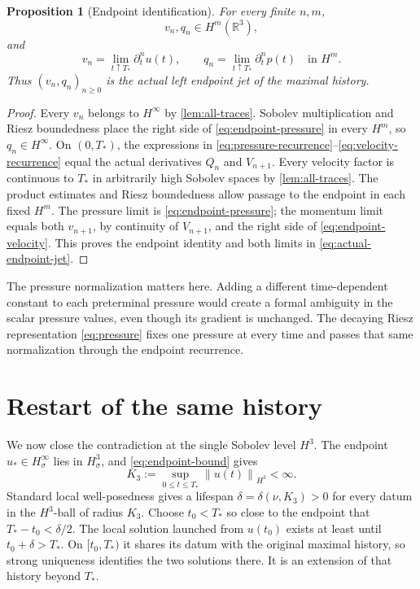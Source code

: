 \documentclass[11pt]{article}
\newtheorem{proposition}[proposition]{Proposition}
\theoremstyle{definition}
\theoremstyle{remark}
\newcommand{\R}{\mathbb R}
\newcommand{\norm}[1]{\left\lVert #1\right\rVert}
\begin{document}
\begin{proposition}[Endpoint identification]
\label{prop:endpoint-jet}
For every finite \(n,m\),
\[
 v_n,q_n\in H^m(\R^3),
\]
and
\begin{equation}
 v_n=\lim_{t\uparrow T_*}\partial_t^n u(t),
 \qquad
 q_n=\lim_{t\uparrow T_*}\partial_t^n p(t)
 \quad\text{in }H^m.
 \label{eq:actual-endpoint-jet}
\end{equation}
Thus \((v_n,q_n)_{n\geq0}\) is the actual left endpoint jet of the maximal
history.
\end{proposition}

\begin{proof}
Every \(v_n\) belongs to \(H^\infty\) by \cref{lem:all-traces}.  Sobolev
multiplication and Riesz boundedness place the right side of
\eqref{eq:endpoint-pressure} in every \(H^m\), so \(q_n\in H^\infty\).
On \((0,T_*)\), the expressions in
\eqref{eq:pressure-recurrence}--\eqref{eq:velocity-recurrence} equal the actual
derivatives \(Q_n\) and \(V_{n+1}\).  Every velocity factor is continuous to
\(T_*\) in arbitrarily high Sobolev spaces by \cref{lem:all-traces}.  The
product estimates and Riesz boundedness allow passage to the endpoint in each
fixed \(H^m\).  The pressure limit is \eqref{eq:endpoint-pressure}; the
momentum limit equals both \(v_{n+1}\), by continuity of \(V_{n+1}\), and the
right side of \eqref{eq:endpoint-velocity}.  This proves the endpoint
identity and both limits in \eqref{eq:actual-endpoint-jet}.
\end{proof}

The pressure normalization matters here.  Adding a different time-dependent
constant to each preterminal pressure would create a formal ambiguity in the
scalar pressure values, even though its gradient is unchanged.  The decaying
Riesz representation \eqref{eq:pressure} fixes one pressure at every time and
passes that same normalization through the endpoint recurrence.

\section{Restart of the same history}
\label{sec:restart}

We now close the contradiction at the single Sobolev level \(H^3\).  The
endpoint \(u_*\in H^\infty_\sigma\) lies in \(H^3_\sigma\), and
\cref{eq:endpoint-bound} gives
\[
 K_3:=\sup_{0\leq t\leq T_*}\norm{u(t)}_{H^3}<\infty.
\]
Standard local well-posedness gives a lifespan
\(\delta=\delta(\nu,K_3)>0\) for every datum in the \(H^3\)-ball of radius
\(K_3\).  Choose \(t_0<T_*\) so close to the endpoint that
\(T_*-t_0<\delta/2\).  The local solution launched from \(u(t_0)\) exists at
least until \(t_0+\delta>T_*\).  On \([t_0,T_*)\) it shares its datum with
the original maximal history, so strong uniqueness identifies the two
solutions there.  It is an extension of that history beyond \(T_*\).
\end{document}
